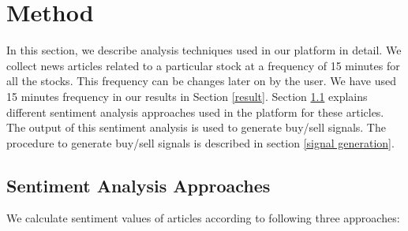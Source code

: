\documentclass[a4paper,11pt]{article}
\begin{document}
\section{Method} \label{Method}
In this section, we describe analysis techniques used in our platform in detail. We collect news articles related to a particular stock at a frequency of 15 minutes for all the stocks. This frequency can be changes later on by the user. We have used 15 minutes frequency in our results in Section \ref{result}. Section \ref{approaches} explains different sentiment analysis approaches used in the platform for these articles. The output of this sentiment analysis is used to generate buy/sell signals. The procedure to generate buy/sell signals is described in section \ref{signal generation}.

\subsection{Sentiment Analysis Approaches} \label{approaches}
We calculate sentiment values of articles according to following three approaches:
\end{document}
